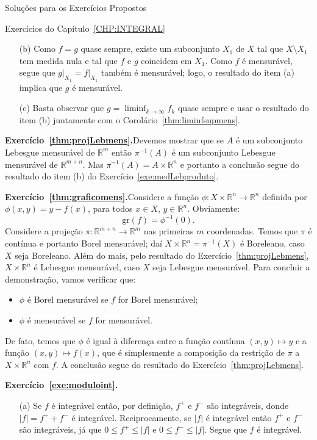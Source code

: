 \documentclass[oneside,final,11pt]{amsbook}
\newcommand{\R}{\mathds R}
\newcommand{\Gr}{\mathrm{gr}}
\theoremstyle{remark}\newtheorem{exercise}{Exercício}[chapter]
\theoremstyle{remark}\newtheorem{*exercise}[exercise]{\hbox to 0pt{\hskip 0pt minus 1fil*}Exercício}
\theoremstyle{definition}\newtheorem{exdefin}{Definição}[chapter]
\theoremstyle{plain}\newtheorem{teo}{Teorema}[section]
\theoremstyle{plain}\newtheorem{lem}[teo]{Lema}
\theoremstyle{plain}\newtheorem{prop}[teo]{Proposição}
\theoremstyle{plain}\newtheorem{cor}[teo]{Corolário}
\theoremstyle{definition}\newtheorem{defin}[teo]{Definição}
\theoremstyle{remark}\newtheorem{rem}[teo]{Observação}
\theoremstyle{definition}\newtheorem{notation}[teo]{Notação}
\theoremstyle{definition}\newtheorem{convention}[teo]{Convenção}
\theoremstyle{definition}\newtheorem{example}[teo]{Exemplo}
\numberwithin{section}{chapter}
\numberwithin{equation}{section}
\begin{document}
\begin{chapter}{Soluções para os Exercícios Propostos}
\begin{section}{Exercícios do Capítulo~\ref{CHP:INTEGRAL}}
\begin{itemize}
\smallskip

\item[(b)] Como $f=g$ quase sempre, existe um subconjunto $X_1$ de $X$ tal que
$X\setminus X_1$ tem medida nula e tal que $f$ e $g$ coincidem em $X_1$. Como
$f$ é mensurável, segue que $g\vert_{X_1}=f\vert_{X_1}$ também é mensurável; logo,
o resultado do item (a) implica que $g$ é mensurável.

\smallskip

\item[(c)] Basta observar que $g=\liminf_{k\to\infty}f_k$ quase sempre e usar o resultado
do item (b) juntamente com o Corolário~\ref{thm:liminfsupmens}.
\end{itemize}

\medskip

\textbf{Exercício~\ref{thm:projLebmens}.}\enspace Devemos mostrar que se $A$ é um subconjunto
Lebesgue mensurável de $\R^m$ então $\pi^{-1}(A)$ é um subconjunto Lebesgue mensurável
de $\R^{m+n}$. Mas $\pi^{-1}(A)=A\times\R^n$ e portanto a conclusão segue do
resultado do item (b) do Exercício~\ref{exe:medLebproduto}.

\medskip

\textbf{Exercício~\ref{thm:graficomens}.}\enspace Considere a função $\phi:X\times\R^n\to\R^n$
definida por $\phi(x,y)=y-f(x)$, para todos $x\in X$, $y\in\R^n$. Obviamente:
\[\Gr(f)=\phi^{-1}(0).\]
Considere a projeção $\pi:\R^{m+n}\to\R^m$ nas primeiras $m$ coordenadas. Temos que $\pi$
é contínua e portanto Borel mensurável; daí $X\times\R^n=\pi^{-1}(X)$ é Boreleano, caso $X$
seja Boreleano. Além do mais, pelo resultado do Exercício~\ref{thm:projLebmens}, $X\times\R^n$
é Lebesgue mensurável, caso $X$ seja Lebesgue mensurável. Para concluir a demonstração, vamos
verificar que:
\begin{itemize}
\item $\phi$ é Borel mensurável se $f$ for Borel mensurável;
\item $\phi$ é mensurável se $f$ for mensurável.
\end{itemize}
De fato, temos que $\phi$ é igual à diferença entre a função contínua $(x,y)\mapsto y$
e a função $(x,y)\mapsto f(x)$, que é simplesmente a composição da restrição de $\pi$
a $X\times\R^n$ com $f$. A conclusão segue do resultado do Exercício~\ref{thm:projLebmens}.

\medskip

\textbf{Exercício~\ref{exe:moduloint}.}
\begin{itemize}
\item[(a)] Se $f$ é integrável então, por definição, $f^+$ e $f^-$ são integráveis,
donde $\vert f\vert=f^++f^-$ é integrável. Reciprocamente, se $\vert f\vert$ é integrável
então $f^+$ e $f^-$ são integráveis, já que $0\le f^+\le\vert f\vert$ e $0\le f^-\le\vert f\vert$.
Segue que $f$ é integrável.


\end{itemize}
\end{section}
\end{chapter}
\end{document}
